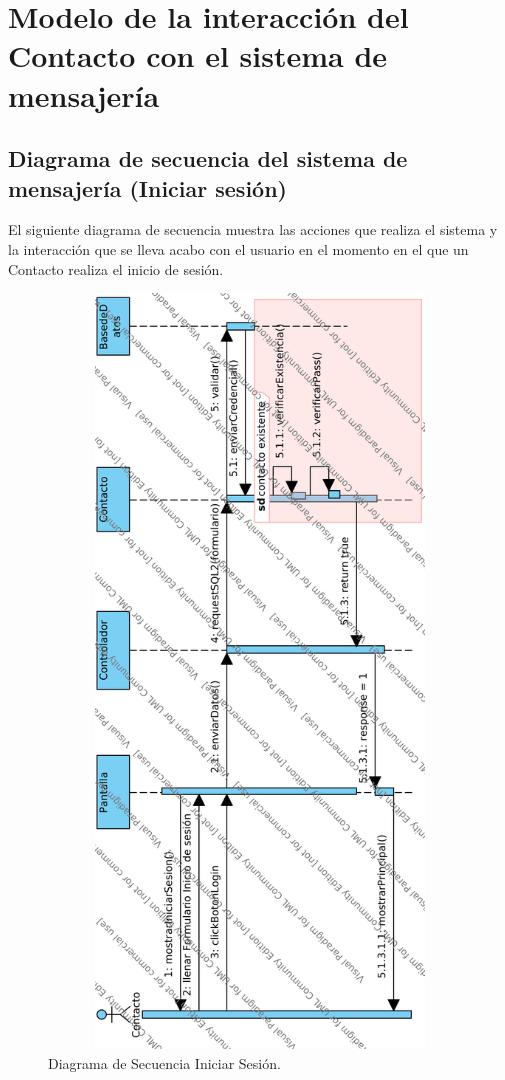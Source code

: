 \section{Modelo de la interacci\'on del Contacto con el sistema de mensajer\'ia }
\subsection{Diagrama de secuencia del sistema de mensajer\'ia (Iniciar sesi\'on)}
El siguiente diagrama de secuencia muestra las acciones que realiza el sistema y la interacci\'on que se lleva acabo con el usuario en el momento en el que un Contacto realiza el inicio de sesi\'on.


	\begin{figure}[htbp!]
		\centering
			\includegraphics[width=15cm, height=20cm]{images/Diagramas/SecIniciarSesion}
		\caption{Diagrama de Secuencia Iniciar Sesi\'on.}
	\end{figure}
	\pagebreak	

